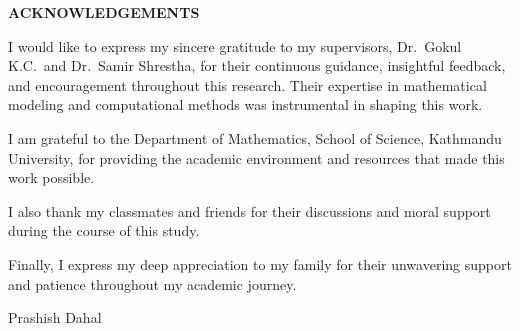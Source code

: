 \newpage
\begin{center}
{\Large \textbf{ACKNOWLEDGEMENTS}}\\[1cm]
\end{center}

\noindent
I would like to express my sincere gratitude to my supervisors, Dr.\ Gokul K.C.\ and Dr.\ Samir Shrestha, for their continuous guidance, insightful feedback, and encouragement throughout this research. Their expertise in mathematical modeling and computational methods was instrumental in shaping this work.

\noindent I am grateful to the Department of Mathematics, School of Science, Kathmandu University, for providing the academic environment and resources that made this work possible.

\noindent I also thank my classmates and friends for their discussions and moral support during the course of this study.

\noindent Finally, I express my deep appreciation to my family for their unwavering support and patience throughout my academic journey.

\vspace{2cm}
\begin{flushright}
Prashish Dahal
\end{flushright}